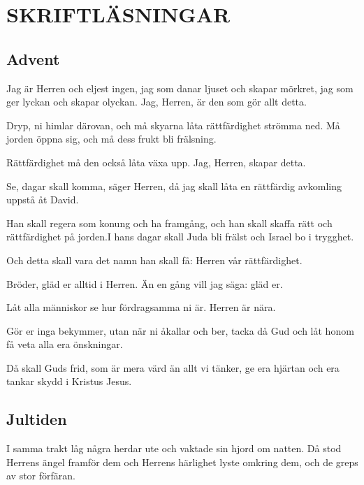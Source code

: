 \chapter{SKRIFTLÄSNINGAR}


\section{Advent}


{Jag är Herren och eljest ingen, jag som danar ljuset och skapar mörkret, jag som ger lyckan och skapar olyckan.} Jag, Herren, är den som gör allt detta.

Dryp, ni himlar därovan, och må skyarna låta rättfärdighet strömma ned. Må jorden öppna 
sig, och må dess frukt bli frälsning. 

Rättfärdighet må den också låta växa upp. Jag, Herren, skapar detta.


{Se, dagar skall komma, säger Herren, då jag skall låta en rättfärdig avkomling uppstå åt David.}

 Han skall regera som konung och ha framgång, och han skall skaffa rätt och rättfärdighet på jorden.I hans dagar skall Juda bli frälst och Israel bo i trygghet. 
 
 Och detta skall vara det namn han skall få: Herren vår rättfärdighet.
 

{Bröder, gläd er alltid i Herren. Än en gång vill jag säga: gläd er.}

 Låt alla människor se hur fördragsamma ni är. Herren är nära. 
 
 Gör er inga bekymmer, utan när ni åkallar och ber, tacka då Gud och låt honom få veta alla era önskningar. 
 
 Då skall Guds frid, som är mera värd än allt vi tänker, ge era hjärtan och era tankar skydd i Kristus Jesus.

\newpage
\section{Jultiden}


{I samma trakt låg några herdar ute och vaktade sin hjord om natten. }
 Då stod Herrens ängel framför dem och Herrens härlighet lyste omkring dem, och de greps av stor förfäran. 
 
